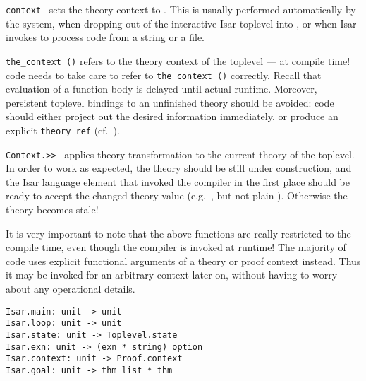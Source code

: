 \begin{isabellebody}
\begin{isamarkuptext}
  \begin{description}

  \item \verb|context|~ sets the {\ML} theory context to
  .  This is usually performed automatically by the system,
  when dropping out of the interactive Isar toplevel into {\ML}, or
  when Isar invokes {\ML} to process code from a string or a file.

  \item \verb|the_context ()| refers to the theory context of the
  {\ML} toplevel --- at compile time!  {\ML} code needs to take care
  to refer to \verb|the_context ()| correctly.  Recall that
  evaluation of a function body is delayed until actual runtime.
  Moreover, persistent {\ML} toplevel bindings to an unfinished theory
  should be avoided: code should either project out the desired
  information immediately, or produce an explicit \verb|theory_ref| (cf.\ ).

  \item \verb|Context.>>|~ applies theory transformation
   to the current theory of the {\ML} toplevel.  In order to
  work as expected, the theory should be still under construction, and
  the Isar language element that invoked the {\ML} compiler in the
  first place should be ready to accept the changed theory value
  (e.g.\ , but not plain ).
  Otherwise the theory becomes stale!

  \end{description}

  It is very important to note that the above functions are really
  restricted to the compile time, even though the {\ML} compiler is
  invoked at runtime!  The majority of {\ML} code uses explicit
  functional arguments of a theory or proof context instead.  Thus it
  may be invoked for an arbitrary context later on, without having to
  worry about any operational details.

  \bigskip

  \begin{mldecls}
  \verb|Isar.main: unit -> unit| \\
  \verb|Isar.loop: unit -> unit| \\
  \verb|Isar.state: unit -> Toplevel.state| \\
  \verb|Isar.exn: unit -> (exn * string) option| \\
  \verb|Isar.context: unit -> Proof.context| \\
  \verb|Isar.goal: unit -> thm list * thm| \\
  \end{mldecls}


\end{isamarkuptext}
\end{isabellebody}
